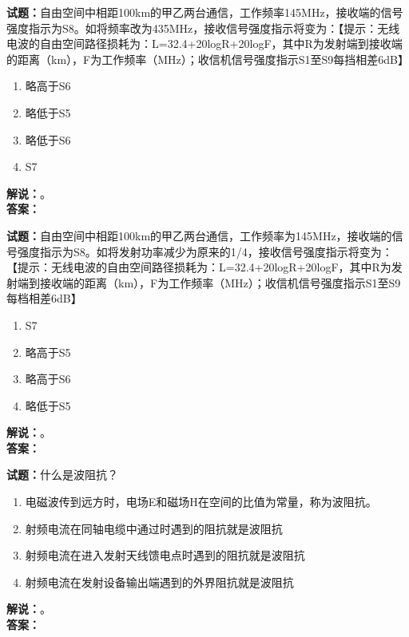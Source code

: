 \documentclass{ctexbook}
\begin{document}
\vspace{\baselineskip}

\noindent\textbf{试题：}自由空间中相距100km的甲乙两台通信，工作频率145\unit{\MHz}，接收端的信号强度指示为S8。如将频率改为435\unit{\MHz}，接收信号强度指示将变为：【提示：无线电波的自由空间路径损耗为：L=32.4+20logR+20logF，其中R为发射端到接收端的距离（km），F为工作频率（\unit{\MHz}）；收信机信号强度指示S1至S9每挡相差6dB】
\begin{enumerate}[leftmargin=3em]
  \item 略高于S6
  \item 略低于S5
  \item 略低于S6
  \item S7
\end{enumerate}
\noindent\textbf{解说：}\textbf{}。\\\noindent\textbf{答案：}

\vspace{\baselineskip}

\noindent\textbf{试题：}自由空间中相距100km的甲乙两台通信，工作频率为145\unit{\MHz}，接收端的信号强度指示为S8。如将发射功率减少为原来的1/4，接收信号强度指示将变为：【提示：无线电波的自由空间路径损耗为：L=32.4+20logR+20logF，其中R为发射端到接收端的距离（km），F为工作频率（\unit{\MHz}）；收信机信号强度指示S1至S9每档相差6dB】
\begin{enumerate}[leftmargin=3em]
  \item S7
  \item 略高于S5
  \item 略高于S6
  \item 略低于S5
\end{enumerate}
\noindent\textbf{解说：}\textbf{}。\\\noindent\textbf{答案：}

\vspace{\baselineskip}

\noindent\textbf{试题：}什么是波阻抗？
\begin{enumerate}[leftmargin=3em]
  \item 电磁波传到远方时，电场E和磁场H在空间的比值为常量，称为波阻抗。
  \item 射频电流在同轴电缆中通过时遇到的阻抗就是波阻抗
  \item 射频电流在进入发射天线馈电点时遇到的阻抗就是波阻抗
  \item 射频电流在发射设备输出端遇到的外界阻抗就是波阻抗
\end{enumerate}
\noindent\textbf{解说：}\textbf{}。\\\noindent\textbf{答案：}
\end{document}
